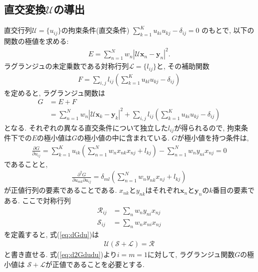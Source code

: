 \subsection{直交変換$\mathcal{U}$の導出}
直交行列$\mathcal{U}=\{u_{ij}\}$の拘束条件(直交条件) $\sum_{k=1}^{K}u_{ki}u_{kj} - \delta_{ij} = 0$ のもとで, 以下の関数の極値を求める:
\begin{align}
  E = \sum_{n=1}^{N} w_{n} |\mathcal{U} \mathbf{x}_{n} - \mathbf{y}_{n}|^{2}.
  \label{eq:E_Kabsch}
\end{align}
ラグランジュの未定乗数である対称行列$\mathcal{L}=\{l_{ij}\}$と, その補助関数
\begin{align}
 F = \sum_{i,j} l_{ij} \left(\sum_{k=1}^{K} u_{kl} u_{kj} - \delta_{ij}\right)
\end{align}
を定めると, ラグランジュ関数は
\begin{align}
  G
&= E + F
 \\
&= \sum_{n=1}^{N} w_{n} |\mathcal{U} \mathbf{x}_{k} - \mathbf{y}_{k}|^{2}
  +
   \sum_{i,j} l_{ij} \left(\sum_{k=1}^{K} u_{ki} u_{kj} - \delta_{ij}\right)
\end{align}
となる. 
それぞれの異なる直交条件について独立した$l_{ij}$が得られるので, 拘束条件下での$E$の極小値は$G$の極小値の中に含まれている. 
$G$が極小値を持つ条件は, 
\begin{align}
 \frac{\partial G}{\partial u_{ij}} 
 =
 \sum_{k=1}^{K} u_{ik} \left(\sum_{n=1}^{N} w_{n} x_{nk} x_{nj} + l_{kj}\right) - \sum_{n=1}^{N} w_{n} y_{ni}x_{nj} = 0
 \label{eq:dGdu}
\end{align}
であることと,
\begin{align}
 \frac{\partial^{2} G}{\partial u_{mk} \partial u_{ij}} 
=
 \delta_{ml} (\sum_{n=1}^{N} w_{n} y_{nk} x_{nj} + l_{kj})
 \label{eq:d2Gdudu}
\end{align}
が正値行列の要素であることである. 
$x_{nk}$と$y_{nk}$はそれぞれ$\bm{x}_{n}$と$\bm{y}_{n}$の$k$番目の要素である. 
ここで対称行列
\begin{align}
 \mathcal{R}_{ij} &= \sum_{n} w_{n} y_{ni} x_{nj} \\
 \mathcal{S}_{ij} &= \sum_{n} w_{n} x_{ni} x_{nj}
\end{align}
を定義すると, 式(\ref{eq:dGdu})は
\begin{align}
 \mathcal{U} (\mathcal{S} + \mathcal{L}) = \mathcal{R}
 \label{eq:d2Gdudu-2}
\end{align}
と書き直せる.
式(\ref{eq:d2Gdudu})より$i=m=1$に対して, ラグランジュ関数$G$の極小値は
$\mathcal{S} + \mathcal{L}$が正値であることを必要とする. 

